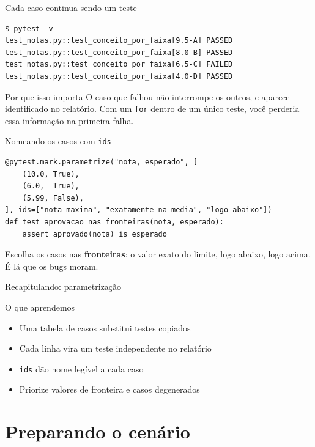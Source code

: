 \documentclass[aspectratio=169]{beamer}
\begin{document}
\begin{frame}[fragile]{Cada caso continua sendo um teste}
\begin{lstlisting}[style=terminal]
$ pytest -v
test_notas.py::test_conceito_por_faixa[9.5-A] PASSED
test_notas.py::test_conceito_por_faixa[8.0-B] PASSED
test_notas.py::test_conceito_por_faixa[6.5-C] FAILED
test_notas.py::test_conceito_por_faixa[4.0-D] PASSED
\end{lstlisting}
  \begin{block}{Por que isso importa}
    O caso que falhou não interrompe os outros, e aparece
    identificado no relatório. Com um \texttt{for} dentro de um único
    teste, você perderia essa informação na primeira falha.
  \end{block}
\end{frame}

\begin{frame}[fragile]{Nomeando os casos com \texttt{ids}}
\begin{lstlisting}
@pytest.mark.parametrize("nota, esperado", [
    (10.0, True),
    (6.0,  True),
    (5.99, False),
], ids=["nota-maxima", "exatamente-na-media", "logo-abaixo"])
def test_aprovacao_nas_fronteiras(nota, esperado):
    assert aprovado(nota) is esperado
\end{lstlisting}
  \small Escolha os casos nas \textbf{fronteiras}: o valor exato do limite,
  logo abaixo, logo acima. É lá que os bugs moram.
\end{frame}

\begin{frame}{Recapitulando: parametrização}
  \begin{block}{O que aprendemos}
    \begin{itemize}
      \item Uma tabela de casos substitui testes copiados
      \item Cada linha vira um teste independente no relatório
      \item \texttt{ids} dão nome legível a cada caso
      \item Priorize valores de fronteira e casos degenerados
    \end{itemize}
  \end{block}
\end{frame}

\part{Preparando o cenário}
\end{document}
